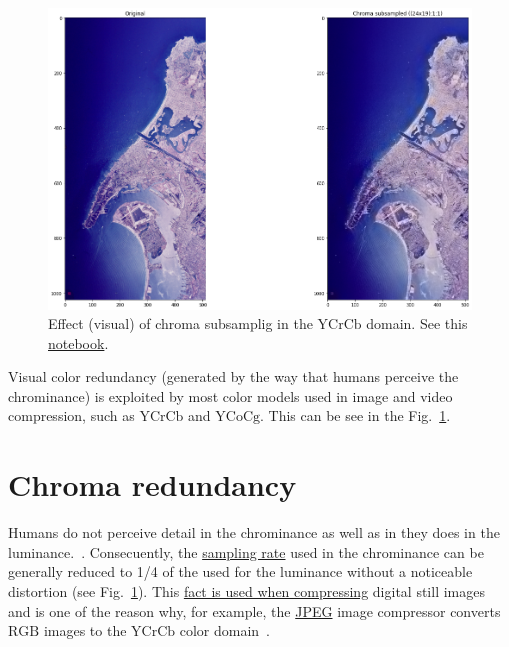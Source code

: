 \begin{figure}
  \centering
  \includegraphics{san-diego_chroma_subsampled}
  \caption{Effect (visual) of chroma subsamplig in the $\text{YCrCb}$ domain. See
    this
    \href{https://github.com/vicente-gonzalez-ruiz/visual_redundancy/blob/master/chroma_subsampling.ipynb}{notebook}.}
  \label{fig:san-diego_chroma_subsampled}
\end{figure}

Visual color redundancy (generated by the way that humans perceive the
chrominance) is exploited by most color models used in image and video
compression, such as $\text{YCrCb}$ and $\text{YCoCg}$. This can be
see in the Fig.~\ref{fig:san-diego_chroma_subsampled}.

\section{Chroma redundancy}

Humans do not perceive detail in the chrominance as well as in they
does in the
luminance.~\cite{vruiz__visual_redundancy,burger2016digital}. Consecuently,
the
\href{https://en.wikipedia.org/wiki/Sampling_(signal_processing)}{sampling
  rate} used in the chrominance can be generally reduced to 1/4 of the
used for the luminance without a noticeable distortion (see
Fig.~\ref{fig:san-diego_chroma_subsampled}). This
\href{https://en.wikipedia.org/wiki/Bandwidth_(computing)}{fact is
  used when compressing} digital still images and is one of the reason
why, for example, the \href{https://en.wikipedia.org/wiki/JPEG}{JPEG}
image compressor converts $\text{RGB}$ images to the $\text{YCrCb}$
color domain~\cite{vruiz__YCrCb}.

